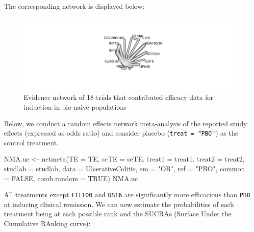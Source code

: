 \documentclass[
  letterpaper,
  DIV=11,
  numbers=noendperiod]{scrreprt}
\newenvironment{Shaded}{\begin{snugshade}}{\end{snugshade}}
\newcommand{\AttributeTok}[1]{\textcolor[rgb]{0.40,0.45,0.13}{#1}}
\newcommand{\CommentTok}[1]{\textcolor[rgb]{0.37,0.37,0.37}{#1}}
\newcommand{\ConstantTok}[1]{\textcolor[rgb]{0.56,0.35,0.01}{#1}}
\newcommand{\DecValTok}[1]{\textcolor[rgb]{0.68,0.00,0.00}{#1}}
\newcommand{\FunctionTok}[1]{\textcolor[rgb]{0.28,0.35,0.67}{#1}}
\newcommand{\NormalTok}[1]{\textcolor[rgb]{0.00,0.23,0.31}{#1}}
\newcommand{\OtherTok}[1]{\textcolor[rgb]{0.00,0.23,0.31}{#1}}
\newcommand{\SpecialCharTok}[1]{\textcolor[rgb]{0.37,0.37,0.37}{#1}}
\newcommand{\StringTok}[1]{\textcolor[rgb]{0.13,0.47,0.30}{#1}}
\begin{document}
The corresponding network is displayed below:

\begin{figure}

{\centering \includegraphics{chapter_10_files/figure-pdf/unnamed-chunk-25-1.pdf}

}

\caption{Evidence network of 18 trials that contributed efficacy data
for induction in bio-naive populations}

\end{figure}

Below, we conduct a random effects network meta-analysis of the reported
study effects (expressed as odds ratio) and consider placebo
(\texttt{treat\ =\ "PBO"}) as the control treatment.

\begin{Shaded}
\begin{Highlighting}[]
\NormalTok{NMA.uc }\OtherTok{\textless{}{-}} \FunctionTok{netmeta}\NormalTok{(}\AttributeTok{TE =}\NormalTok{ TE, }\AttributeTok{seTE =}\NormalTok{ seTE, }\AttributeTok{treat1 =}\NormalTok{ treat1, }\AttributeTok{treat2 =}\NormalTok{ treat2,}
                  \AttributeTok{studlab =}\NormalTok{ studlab, }\AttributeTok{data =}\NormalTok{ UlcerativeColitis, }\AttributeTok{sm =} \StringTok{"OR"}\NormalTok{, }
                  \AttributeTok{ref =} \StringTok{"PBO"}\NormalTok{, }\AttributeTok{common =} \ConstantTok{FALSE}\NormalTok{, }\AttributeTok{comb.random =} \ConstantTok{TRUE}\NormalTok{)}
\NormalTok{NMA.uc}
\end{Highlighting}
\end{Shaded}

All treatments except \texttt{FIL100} and \texttt{UST6} are
significantly more efficacious than \texttt{PBO} at inducing clinical
remission. We can now estimate the probabilities of each treatment being
at each possible rank and the SUCRAs (Surface Under the Cumulative
RAnking curve):

\begin{Shaded}
\end{Shaded}
\end{document}

